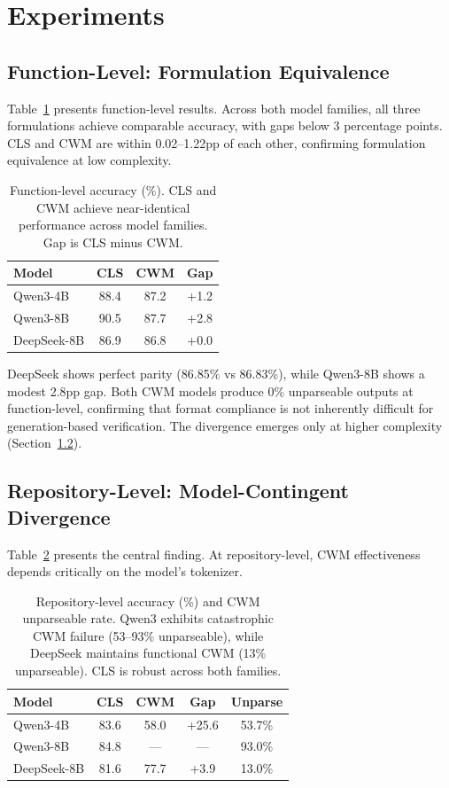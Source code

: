 \documentclass[11pt,a4paper]{article}
\begin{document}
\section{Experiments}

\subsection{Function-Level: Formulation Equivalence}

Table~\ref{tab:func} presents function-level results. Across both model families, all three formulations achieve comparable accuracy, with gaps below 3 percentage points. CLS and CWM are within 0.02--1.22pp of each other, confirming formulation equivalence at low complexity.

\begin{table}[t]
\centering
\small
\begin{tabular}{lccc}
\toprule
\textbf{Model} & \textbf{CLS} & \textbf{CWM} & \textbf{Gap} \\
\midrule
Qwen3-4B & 88.4 & 87.2 & +1.2 \\
Qwen3-8B & 90.5 & 87.7 & +2.8 \\
DeepSeek-8B & 86.9 & 86.8 & +0.0 \\
\bottomrule
\end{tabular}
\caption{Function-level accuracy (\%). CLS and CWM achieve near-identical performance across model families. Gap is CLS minus CWM.}
\label{tab:func}
\end{table}

DeepSeek shows perfect parity (86.85\% vs 86.83\%), while Qwen3-8B shows a modest 2.8pp gap. Both CWM models produce 0\% unparseable outputs at function-level, confirming that format compliance is not inherently difficult for generation-based verification. The divergence emerges only at higher complexity (Section~\ref{sec:repo}).

\subsection{Repository-Level: Model-Contingent Divergence}
\label{sec:repo}

Table~\ref{tab:repo} presents the central finding. At repository-level, CWM effectiveness depends critically on the model's tokenizer.

\begin{table}[t]
\centering
\small
\begin{tabular}{lcccc}
\toprule
\textbf{Model} & \textbf{CLS} & \textbf{CWM} & \textbf{Gap} & \textbf{Unparse} \\
\midrule
Qwen3-4B & 83.6 & 58.0 & +25.6 & 53.7\% \\
Qwen3-8B & 84.8 & --- & --- & 93.0\% \\
DeepSeek-8B & 81.6 & 77.7 & +3.9 & 13.0\% \\
\bottomrule
\end{tabular}
\caption{Repository-level accuracy (\%) and CWM unparseable rate. Qwen3 exhibits catastrophic CWM failure (53--93\% unparseable), while DeepSeek maintains functional CWM (13\% unparseable). CLS is robust across both families.}
\label{tab:repo}
\end{table}
\end{document}
